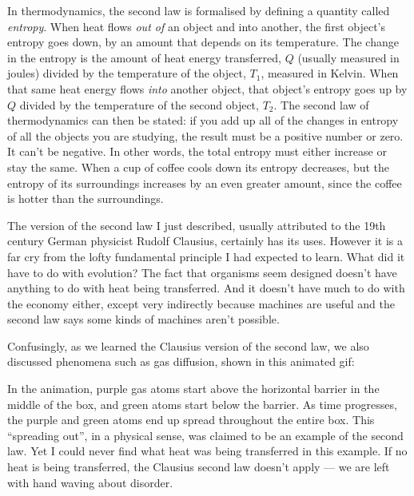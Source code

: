 \documentclass[a4paper, 12pt]{article}
\begin{document}
In thermodynamics, the second law is formalised by defining a quantity called
{\em entropy}. When heat flows {\em out of} an object and into another,
the first object's entropy goes
down, by an amount that depends on its temperature.
The change in the entropy is the amount of heat energy transferred,
$Q$ (usually measured in joules)
divided by the temperature of the object, $T_1$, measured in Kelvin.
When that same heat energy flows {\em into} another object, that object's
entropy goes up by $Q$ divided by the temperature of the
second object, $T_2$. The second law of thermodynamics can then be stated: if you
add up all of the changes in entropy of all the objects you are studying,
the result must be a positive number or zero. It can't be negative. In other
words, the total entropy must either increase or stay the same.
When a cup of coffee cools down its entropy decreases, but the entropy of its
surroundings increases by an even greater amount,
since the coffee is hotter than the surroundings.

The version of
the second law I just described, usually attributed to the 19th century
German physicist Rudolf Clausius, certainly has its uses. However it is a far
cry from the lofty fundamental principle I had expected to learn. What did it
have to do with evolution? The fact that organisms seem designed doesn't have
anything to do with heat being transferred. And it doesn't have much to do
with the economy either, except very indirectly because machines are useful
and the second law says some kinds of machines aren't possible.

Confusingly, as we learned the Clausius version of the second law, we also
discussed phenomena such as gas diffusion, shown in this animated gif:

\begin{figure}[ht!]
\centering
{}
\end{figure}

In the animation, purple gas atoms start above the horizontal barrier in the
middle of the box, and green atoms start below the barrier.
As time progresses, the purple and green atoms end up spread throughout the entire
box. This ``spreading out'', in a physical sense, was claimed to be an example
of the second law. Yet I could never find what heat was being transferred
in this example. If no heat is being transferred, the Clausius second law
doesn't apply --- we are left with hand waving about disorder.
\end{document}
